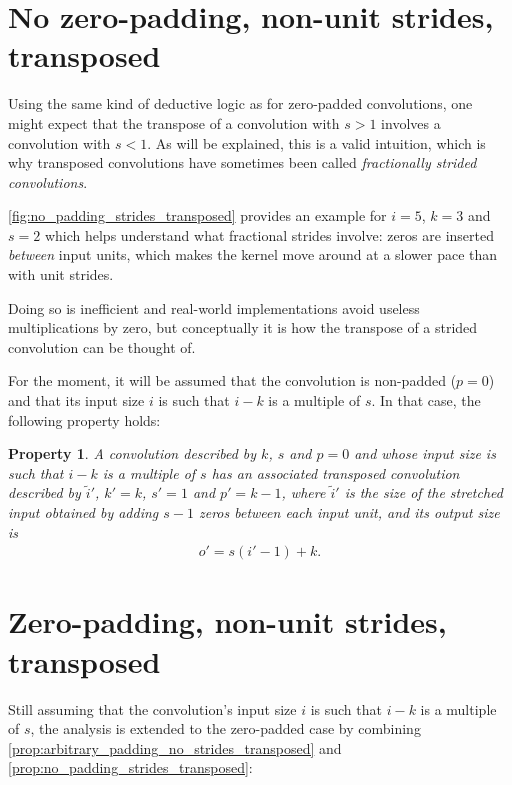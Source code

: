 \documentclass{report}
\newtheorem{prop}{Property}
\begin{document}
\section{No zero-padding, non-unit strides, transposed}

Using the same kind of deductive logic as for zero-padded convolutions, one
might expect that the transpose of a convolution with $s > 1$ involves a
convolution with $s < 1$. As will be explained, this is a valid intuition, which
is why transposed convolutions have sometimes been called {\em fractionally
strided convolutions}.

\autoref{fig:no_padding_strides_transposed} provides an example for $i = 5$, $k
= 3$ and $s = 2$ which helps understand what fractional strides involve: zeros
are inserted {\em between} input units, which makes the kernel move around at a
slower pace than with unit strides.

Doing so is inefficient and real-world implementations avoid useless
multiplications by zero, but conceptually it is how the transpose of a strided
convolution can be thought of.

For the moment, it will be assumed that the convolution is non-padded ($p = 0$)
and that its input size $i$ is such that $i - k$ is a multiple of $s$. In that
case, the following property holds:

\begin{prop}\label{prop:no_padding_strides_transposed}
A convolution described by $k$, $s$ and $p = 0$ and whose input size is such
that $i - k$ is a multiple of $s$ has an associated transposed convolution
described by $\tilde{i}'$, $k' = k$, $s' = 1$ and $p' = k - 1$, where
$\tilde{i}'$ is the size of the stretched input obtained by adding $s - 1$ zeros
between each input unit, and its output size is
\begin{equation*}
\begin{split}
    o' = s (i' - 1) + k.
\end{split}
\end{equation*}
\end{prop}

\section{Zero-padding, non-unit strides, transposed}

Still assuming that the convolution's input size $i$ is such that $i - k$ is a
multiple of $s$, the analysis is extended to the zero-padded case by combining
\autoref{prop:arbitrary_padding_no_strides_transposed} and
\autoref{prop:no_padding_strides_transposed}:
\end{document}

